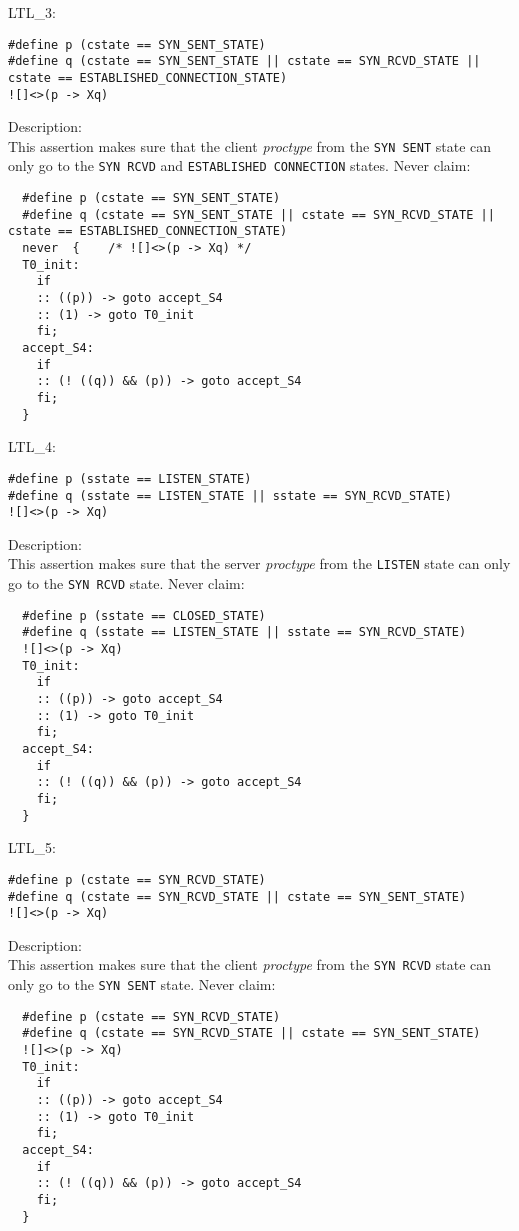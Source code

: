 \documentclass{WigReport}
\begin{document}
LTL\_3:\\
\begin{lstlisting}
#define p (cstate == SYN_SENT_STATE)
#define q (cstate == SYN_SENT_STATE || cstate == SYN_RCVD_STATE || cstate == ESTABLISHED_CONNECTION_STATE)
![]<>(p -> Xq)
\end{lstlisting}
Description:\\
This assertion makes sure that the client \textit{proctype} from the \verb|SYN SENT| state can only go to the \verb|SYN RCVD| and \verb|ESTABLISHED CONNECTION| states.
Never claim:\\
\begin{lstlisting}
  #define p (cstate == SYN_SENT_STATE)
  #define q (cstate == SYN_SENT_STATE || cstate == SYN_RCVD_STATE || cstate == ESTABLISHED_CONNECTION_STATE)
  never  {    /* ![]<>(p -> Xq) */
  T0_init:
    if
    :: ((p)) -> goto accept_S4
    :: (1) -> goto T0_init
    fi;
  accept_S4:
    if
    :: (! ((q)) && (p)) -> goto accept_S4
    fi;
  }
\end{lstlisting}


LTL\_4:\\
\begin{lstlisting}
#define p (sstate == LISTEN_STATE)
#define q (sstate == LISTEN_STATE || sstate == SYN_RCVD_STATE)
![]<>(p -> Xq)
\end{lstlisting}
Description:\\
This assertion makes sure that the server \textit{proctype} from the \verb|LISTEN| state can only go to the \verb|SYN RCVD| state.
Never claim:\\
\begin{lstlisting}
  #define p (sstate == CLOSED_STATE)
  #define q (sstate == LISTEN_STATE || sstate == SYN_RCVD_STATE)
  ![]<>(p -> Xq)
  T0_init:
    if
    :: ((p)) -> goto accept_S4
    :: (1) -> goto T0_init
    fi;
  accept_S4:
    if
    :: (! ((q)) && (p)) -> goto accept_S4
    fi;
  }
\end{lstlisting}


LTL\_5:\\
\begin{lstlisting}
#define p (cstate == SYN_RCVD_STATE)
#define q (cstate == SYN_RCVD_STATE || cstate == SYN_SENT_STATE)
![]<>(p -> Xq)
\end{lstlisting}
Description:\\
This assertion makes sure that the client \textit{proctype} from the \verb|SYN RCVD| state can only go to the \verb|SYN SENT| state.
Never claim:\\
\begin{lstlisting}
  #define p (cstate == SYN_RCVD_STATE)
  #define q (cstate == SYN_RCVD_STATE || cstate == SYN_SENT_STATE)
  ![]<>(p -> Xq)
  T0_init:
    if
    :: ((p)) -> goto accept_S4
    :: (1) -> goto T0_init
    fi;
  accept_S4:
    if
    :: (! ((q)) && (p)) -> goto accept_S4
    fi;
  }
\end{lstlisting}
\end{document}
